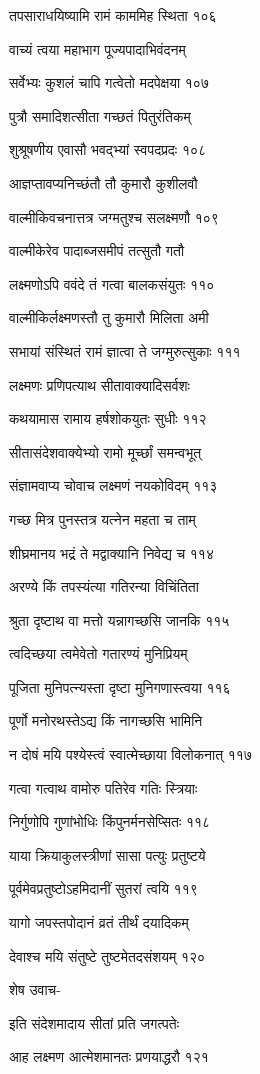 तपसाराधयिष्यामि रामं काममिह स्थिता १०६

वाच्यं त्वया महाभाग पूज्यपादाभिवंदनम्

सर्वेभ्यः कुशलं चापि गत्वेतो मदपेक्षया १०७

पुत्रौ समादिशत्सीता गच्छतं पितुरंतिकम्

शुश्रूषणीय एवासौ भवद्भ्यां स्वपदप्रदः १०८

आज्ञप्तावप्यनिच्छंतौ तौ कुमारौ कुशीलवौ

वाल्मीकिवचनात्तत्र जग्मतुश्च सलक्ष्मणौ १०९

वाल्मीकेरेव पादाब्जसमीपं तत्सुतौ गतौ

लक्ष्मणोऽपि ववंदे तं गत्वा बालकसंयुतः ११०

वाल्मीकिर्लक्ष्मणस्तौ तु कुमारौ मिलिता अमी

सभायां संस्थितं रामं ज्ञात्वा ते जग्मुरुत्सुकाः १११

लक्ष्मणः प्रणिपत्याथ सीतावाक्यादिसर्वशः

कथयामास रामाय हर्षशोकयुतः सुधीः ११२

सीतासंदेशवाक्येभ्यो रामो मूर्च्छां समन्वभूत्

संज्ञामवाप्य चोवाच लक्ष्मणं नयकोविदम् ११३

गच्छ मित्र पुनस्तत्र यत्नेन महता च ताम्

शीघ्रमानय भद्रं ते मद्वाक्यानि निवेद्य च ११४

अरण्ये किं तपस्यंत्या गतिरन्या विचिंतिता

श्रुता दृष्टाथ वा मत्तो यन्नागच्छसि जानकि ११५

त्वदिच्छया त्वमेवेतो गतारण्यं मुनिप्रियम्

पूजिता मुनिपत्न्यस्ता दृष्टा मुनिगणास्त्वया ११६

पूर्णो मनोरथस्तेऽद्य किं नागच्छसि भामिनि

न दोषं मयि पश्येस्त्वं स्वात्मेच्छाया विलोकनात् ११७

गत्वा गत्वाथ वामोरु पतिरेव गतिः स्त्रियाः

निर्गुणोपि गुणांभोधिः किंपुनर्मनसेप्सितः ११८

याया क्रियाकुलस्त्रीणां सासा पत्युः प्रतुष्टये

पूर्वमेवप्रतुष्टोऽहमिदानीं सुतरां त्वयि ११९

यागो जपस्तपोदानं व्रतं तीर्थं दयादिकम्

देवाश्च मयि संतुष्टे तुष्टमेतदसंशयम् १२०

शेष उवाच-

इति संदेशमादाय सीतां प्रति जगत्पतेः

आह लक्ष्मण आत्मेशमानतः प्रणयाद्धरौ १२१

